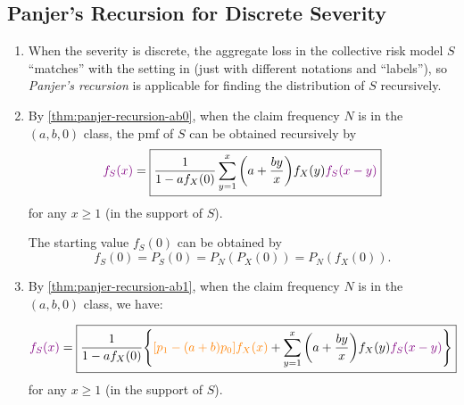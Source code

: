 \subsection{Panjer's Recursion for Discrete Severity}
\begin{enumerate}
\item When the severity is discrete, the aggregate loss in the collective risk
model \(S\) ``matches'' with the setting in
 (just with different notations and
``labels''), so \emph{Panjer's recursion} is applicable for finding the
distribution of \(S\) recursively.

\item \label{it:panjer-recursion-ab0-agg-loss}
By \cref{thm:panjer-recursion-ab0}, when the claim frequency \(N\) is in
the \((a,b,0)\) class, the pmf of \(S\) can be obtained recursively by
\[
{\color{violet}f_S(x)}=\boxed{\frac{1}{1-af_X(0)}\sum_{y=1}^{x}\qty(a+\frac{by}{x})f_X(y){\color{violet}f_S(x-y)}}
\]
for any \(x\ge 1\) (in the support of \(S\)).

\begin{note}
The starting value \(f_S(0)\) can be obtained by
\[
f_S(0)=P_S(0)=P_N(P_X(0))=P_N(f_X(0)).
\]
\end{note}

\item \label{it:panjer-recursion-ab1-agg-loss}
By \cref{thm:panjer-recursion-ab1}, when the claim frequency \(N\) is in
the \((a,b,0)\) class, we have:

\[
{\color{violet}f_S(x)}=\boxed{\frac{1}{1-af_X(0)}\qty{
{\color{orange}[p_1-(a+b)p_0]f_X(x)}+
\sum_{y=1}^{x}\qty(a+\frac{by}{x})f_X(y){\color{violet}f_S(x-y)}}}
\]
for any \(x\ge 1\) (in the support of \(S\)).
\end{enumerate}

